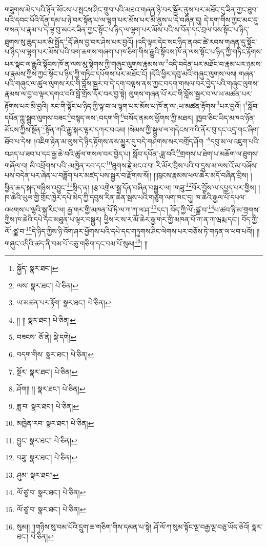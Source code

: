 གཟུགས་མེད་པའི་ཉོན་མོངས་པ་སྤངས་ཤིང་གྲུབ་པའི་མཐའ་གཞན་ཉེ་བར་སྦྱོར་ནུས་པར་མཐོང་དུ་ཟིན་ཀྱང་ཐུབ་པའི་དབང་པོའི་དོན་དམ་པ་ཉེ་བར་སྟོན་པ་ལ་ལྷག་པར་མོས་པར་མི་ནུས་པ་དེ་བཞིན་དུ། དེ་དག་གིས་ཀྱང་མང་དུ་གསན་པ་རྣམ་པ་དེ་ལྟ་བུ་མངར་ཟིན་ཀྱང་སྟོང་པ་ཉིད་ལ་ལྷག་པར་མོས་པའི་ས་བོན་དང་བྲལ་བས་སྟོང་པ་ཉིད་ཐུགས་སུ་ཆུད་པར་མི་སྤྱོད་\footnote{སྐྱོད་  སྣར་ཐང་། }དོ་ཞེས་བྱ་བར་ཤེས་པར་བྱའོ། །འདི་ལྟར་དེང་སང་ཉིད་ནའང་ཚེ་རབས་གཞན་དུ་སྟོང་པ་ཉིད་ལ་ལྷག་པར་མོས་པའི་བག་ཆགས་གཞག་པ་ཁ་ཅིག་གིས་རྒྱུའི་སྟོབས་ཁོ་ན་ལས་སྟོང་པ་ཉིད་ཀྱི་གཏིང་རྟོགས་པར་སྣང་ལ་རྒྱུའི་སྟོབས་ཁོ་ན་ལས་མུ་སྟེགས་ཀྱི་གཞུང་ལུགས་རྣམས་ལ་\footnote{ལས་  སྣར་ཐང་།  པེ་ཅིན། }འདི་བདེན་པར་མཐོང་བ་རྣམ་པར་ཉམས་པ་རྣམས་ཀྱིས་ཀྱང་སྟོང་པ་ཉིད་ཀྱི་གཏིང་དཔོགས་པར་མཐོང་ངོ། །དེའི་ཕྱིར་དབུ་མའི་གཞུང་ལུགས་ལས། གཞན་པའི་གཞུང་ལ་ཚུལ་ལུགས་རང་གི་བློས་སྦྱར་བ་དེ་དག་བལྟས་ནས་ཀྱང་བདག་གསལ་བར་བྱེད་པའི་གཞུང་ལུགས་རྣམས་ལ་བྱ་བ་ལྟར་དགའ་བའི་བློ་གྲོས་དོར་བར་བྱ་སྟེ། ལུགས་གཞན་པོ་རང་གི་བློས་སྦྱར་བ་ལ་ཡ་མཚན་པར་རྟོགས་པར་མི་བྱའི། རང་གི་སྟོང་པ་ཉིད་ཀྱི་ལྟ་བ་ལ་ལྷག་པར་མོས་པ་ཁོ་ན་ལ་:ཡ་མཚན་རྟོགས་\footnote{ཡ་མཚན་པར་རྟོག་  སྣར་ཐང་།  པེ་ཅིན། }པར་བྱའོ། །\footnote{།། །།  སྣར་ཐང་།  པེ་ཅིན། }སློབ་དཔོན་ཀླུ་སྒྲུབ་ལུགས་བཟང་\footnote{བཟངས་  ཅོ་ནེ།  སྡེ་དགེ། }བསྙད་ལས་:བདག་གི་\footnote{བདག་གིས་  སྣར་ཐང་།  པེ་ཅིན། }བསོད་ནམས་ཕྱོགས་ཀྱི་མཐར། །ཁྱབ་ཅིང་ཡིད་མཁའ་ཉོན་མོངས་ཀྱིས་སྔོན་\footnote{སྔོར་  སྣར་ཐང་།  པེ་ཅིན། }སྟོན་ཀའི་རྒྱུ་སྐར་ལྟར་དཀར་བའམ། །སེམས་ཀྱི་སྦྲུལ་ལ་གདེངས་ཀའི་ནོར་བུ་དང་འདྲ་གང་ཞིག་ཐོབ་པ་དེས། །འཇིག་རྟེན་མ་ལུས་དེ་ཉིད་རྟོགས་ནས་མྱུར་དུ་བདེ་གཤེགས་སར་བགྲོད་ཤོག ་\footnote{ཤོག།། །།  སྣར་ཐང་།  པེ་ཅིན། }དབུ་མ་ལ་འཇུག་པའི་བཤད་པ་ཟབ་པ་དང་རྒྱ་ཆེ་བའི་ཚུལ་གསལ་བར་བྱེད་པ། སློབ་དཔོན་:ཟླ་བའི་\footnote{ཟླ་བ་  སྣར་ཐང་།  པེ་ཅིན། }གྲགས་པ་ཐེག་པ་མཆོག་ལ་ཐུགས་གཞོལ་བ། མི་འཕྲོགས་པའི་:མཁྱེན་རབ་དང་\footnote{མཁྱེན་རབ་  སྣར་ཐང་།  པེ་ཅིན། }ཐུགས་རྗེ་མངའ་བ། རི་མོར་བྲིས་པའི་བ་དྲུས་མ་ལས་འོ་མ་བཞོས་པས་བདེན་པར་ཞེན་པ་བཟློག་པར་མཛད་པས་སྦྱར་བ་རྫོགས་སོ།། །།ཁུངས་རྣམས་ཕལ་ཆེར་མདོ་བཞིན་བྲིས། །ཕྱིན་ཆད་སྐད་གཉིས་འབྱུང་\footnote{བྱུང་  སྣར་ཐང་།  པེ་ཅིན། }སྲིད་ན། །རྩ་འགྲེལ་སྒྲ་དོན་བཞིན་བསྒྱུར་ལ། །གཟུ་\footnote{བཟུ་  སྣར་ཐང་།  པེ་ཅིན། }བོར་བྱོས་ལ་དཔྱད་པར་གྱིས། །ཁ་ཆེའི་ཡུལ་གྱི་གྲོང་ཁྱེར་དཔེ་མེད་ཀྱི་དབུས་རིན་ཆེན་སྦས་པའི་གཙུག་ལག་ཁང་དུ། ཁ་ཆེའི་རྒྱལ་པོ་དཔལ་འཕགས་པ་ལྷའི་སྐུ་རིང་ལ། རྒྱ་གར་གྱི་མཁན་པོ་ཏི་ལ་ཀ་ཀ་ལ་ཤ་\footnote{ཤུམ་  སྣར་ཐང་། }དང་། བོད་ཀྱི་ལོ་:ཙྪ་བ་\footnote{ལོ་ཙཱ་བ་  སྣར་ཐང་།  པེ་ཅིན། }པ་ཚབ་ཉི་མ་གྲགས་ཀྱིས་ཁ་ཆེའི་དཔེ་དང་མཐུན་པ་ལྟར་བསྒྱུར། ཕྱིས་ར་ས་ར་མོ་ཆེར་རྒྱ་གར་གྱི་མཁན་པོ་ཀ་ན་ཀ་ཝརྨ་དང་། བོད་ཀྱི་ལོ་:ཙྪ་བ་\footnote{ལོ་ཙཱ་བ་  སྣར་ཐང་།  པེ་ཅིན། }དེ་ཉིད་ཀྱིས་ཉི་འོག་ཤར་ཕྱོགས་པའི་དཔེ་དང་གཏུགས་ཤིང་ལེགས་པར་བཅོས་ཏེ་གཏན་ལ་ཕབ་པའོ།། །།གཞུང་འདིའི་ཚད་ནི་བམ་པོ་བཅུ་གཅིག་དང་བམ་པོ་སུམ།\footnote{སུམ།། །།གཉིས་སུ་བམ་པོའི་དྲུག་ཆ་གཅིག་གིས་དམན་པ་སྟེ། ཤོ་ལོ་ཀ་སུམ་སྟོང་ལྔ་བརྒྱ་ལྔ་བཅུ་ཡོད་ཅེའོ།  སྣར་ཐང་།  པེ་ཅིན། }། །།